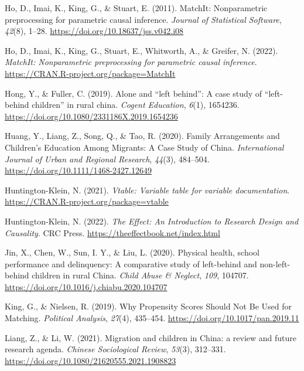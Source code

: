 \documentclass[
  man,floatsintext]{apa7}
\newlength{\cslhangindent}
\newlength{\cslentryspacingunit} %
\newenvironment{CSLReferences}[2] %
 {%
  \setlength{\parindent}{0pt}
  \ifodd #1
  \let\oldpar\par
  \def\par{\hangindent=\cslhangindent\oldpar}
  \fi
  \setlength{\parskip}{#2\cslentryspacingunit}
 }%
 {}
\begin{document}
\begin{CSLReferences}{1}{0}
\leavevmode{}%
Ho, D., Imai, K., King, G., \& Stuart, E. (2011). {MatchIt}: Nonparametric preprocessing for parametric causal inference. \emph{Journal of Statistical Software}, \emph{42}(8), 1--28. \url{https://doi.org/10.18637/jss.v042.i08}

\leavevmode{}%
Ho, D., Imai, K., King, G., Stuart, E., Whitworth, A., \& Greifer, N. (2022). \emph{MatchIt: Nonparametric preprocessing for parametric causal inference}. \url{https://CRAN.R-project.org/package=MatchIt}

\leavevmode{}%
Hong, Y., \& Fuller, C. (2019). Alone and {``}left behind{''}: A case study of {``}left-behind children{''} in rural china. \emph{Cogent Education}, \emph{6}(1), 1654236. \url{https://doi.org/10.1080/2331186X.2019.1654236}

\leavevmode{}%
Huang, Y., Liang, Z., Song, Q., \& Tao, R. (2020). Family Arrangements and Children's Education Among Migrants: A Case Study of China. \emph{International Journal of Urban and Regional Research}, \emph{44}(3), 484--504. \url{https://doi.org/10.1111/1468-2427.12649}

\leavevmode{}%
Huntington-Klein, N. (2021). \emph{Vtable: Variable table for variable documentation}. \url{https://CRAN.R-project.org/package=vtable}

\leavevmode{}%
Huntington-Klein, N. (2022). \emph{The Effect: An Introduction to Research Design and Causality}. CRC Press. \url{https://theeffectbook.net/index.html}

\leavevmode{}%
Jin, X., Chen, W., Sun, I. Y., \& Liu, L. (2020). Physical health, school performance and delinquency: A comparative study of left-behind and non-left-behind children in rural China. \emph{Child Abuse \& Neglect}, \emph{109}, 104707. \url{https://doi.org/10.1016/j.chiabu.2020.104707}

\leavevmode{}%
King, G., \& Nielsen, R. (2019). Why Propensity Scores Should Not Be Used for Matching. \emph{Political Analysis}, \emph{27}(4), 435--454. \url{https://doi.org/10.1017/pan.2019.11}

\leavevmode{}%
Liang, Z., \& Li, W. (2021). Migration and children in China: a review and future research agenda. \emph{Chinese Sociological Review}, \emph{53}(3), 312--331. \url{https://doi.org/10.1080/21620555.2021.1908823}


\end{CSLReferences}
\end{document}
